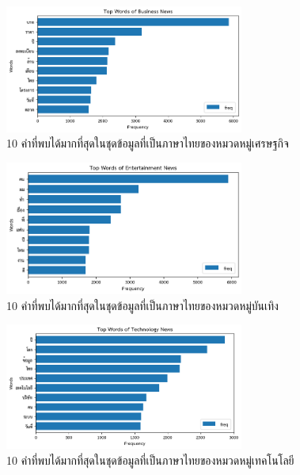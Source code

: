 \documentclass[12pt,oneside,openright,a4paper]{cpe-thai-project}
\begin{document}
\begin{itemize}
\begin{figure}[!ht]
        \end{figure}
        \newpage
        \begin{figure}[!ht]\centering
          \includegraphics[width=0.7\textwidth]{./img/thai_stat/money_bar.png}
          \caption{10 คำที่พบได้มากที่สุดในชุดข้อมูลที่เป็นภาษาไทยของหมวดหมู่เศรษฐกิจ}\label{fig:money_bar_th}
        \end{figure}
        \begin{figure}[!ht]\centering
          \includegraphics[width=0.7\textwidth]{./img/thai_stat/ent_bar.png}
          \caption{10 คำที่พบได้มากที่สุดในชุดข้อมูลที่เป็นภาษาไทยของหมวดหมู่บันเทิง}\label{fig:ent_bar_th}
        \end{figure}\begin{figure}[!ht]\centering
          \includegraphics[width=0.7\textwidth]{./img/thai_stat/tech_bar.png}
          \caption{10 คำที่พบได้มากที่สุดในชุดข้อมูลที่เป็นภาษาไทยของหมวดหมู่เทคโนโลยี}\label{fig:tech_bar_th}
        \end{figure}
        

\end{itemize}
\end{document}
